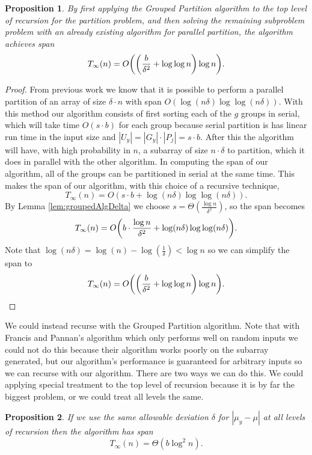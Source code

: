 \documentclass[twocolumn, twoside, 12pt]{article}
\DeclarePairedDelimiter{\paren}{(}{)}
\renewcommand{\paragraph}[1]{\vspace{0.09in}\noindent{\bf \boldmath #1.}}
\newtheorem{proposition}{Proposition}
\begin{document}
\begin{proposition}
By first applying the Grouped Partition algorithm to the top level of recursion for the partition problem, and then solving the remaining subproblem problem with an already existing algorithm for parallel partition, the algorithm achieves span
	$$T_\infty(n) = O\paren*{\paren*{\frac{b}{\delta^2} + \log\log n} \log n}.$$
\end{proposition}
\begin{proof}
From previous work we know that it is possible to perform a parallel partition of an array of size $\delta\cdot n$ with span $O(\log(n\delta)\log\log(n\delta)).$ 
With this method our algorithm consists of first sorting each of the $g$ groups in serial, which will take time $O(s\cdot b)$ for each group because serial partition is has linear run time in the input size and $|U_y|=|G_y|\cdot |P_j| = s \cdot b$. 
After this the algorithm will have, with high probability in $n$, a subarray of size $n \cdot \delta$ to partition, which it does in parallel with the other algorithm. 
In computing the span of our algorithm, all of the groups can be partitioned in serial at the same time. 
This makes the span of our algorithm, with this choice of a recursive technique, 
	$$T_\infty(n) = O(s\cdot b + \log(n\delta)\log\log(n\delta)).$$ 
	By Lemma \ref{lem:groupedAlgDelta} we choose $s = \Theta(\frac{\log n}{\delta^2})$, so the span becomes 
	$$T_\infty(n)=  O\paren*{b \cdot \frac{\log n}{\delta ^2} + \log(n\delta)\log\log(n\delta)}.$$
Note that $\log(n\delta) = \log(n) - \log(\frac{1}{\delta}) < \log n$ so we can simplify the span to
	$$T_\infty(n) = O\paren*{\paren*{\frac{b}{\delta^2} + \log\log n} \log n}.$$
\end{proof}

\paragraph{Recursing With the Same Algorithm}
We could instead recurse with the Grouped Partition algorithm.
Note that with Francis and Pannan's algorithm which only performs well on random inputs we could not do this because their algorithm works poorly on the subarray generated, but our algorithm's performance is guaranteed for arbitrary inputs so we can recurse with our algorithm.
There are two ways we can do this. We could applying special treatment to the top level of recursion because it is by far the biggest problem, or we could treat all levels the same.

\begin{proposition}
If we use the same allowable deviation $\delta$ for $|\mu_y - \mu|$ at all levels of recursion then the algorithm has span $$T_{\infty}(n) = \Theta(b\log^2 n).$$
\end{proposition}
\end{document}
